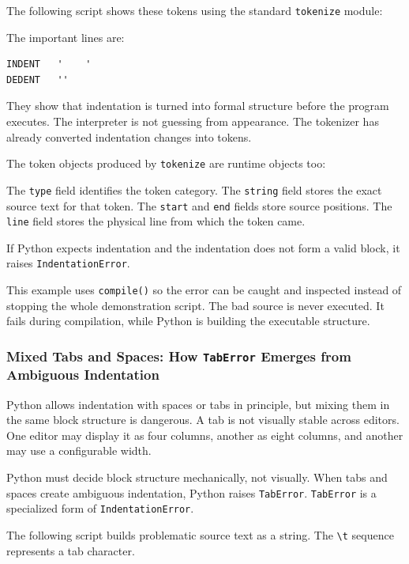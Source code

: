 The following script shows these tokens using the standard \texttt{tokenize} module:

The important lines are:

\begin{verbatim}
INDENT   '    '
DEDENT   ''
\end{verbatim}

They show that indentation is turned into formal structure before the program executes. The interpreter is not guessing from appearance. The tokenizer has already converted indentation changes into tokens.

The token objects produced by \texttt{tokenize} are runtime objects too:

The \texttt{type} field identifies the token category. The \texttt{string} field stores the exact source text for that token. The \texttt{start} and \texttt{end} fields store source positions. The \texttt{line} field stores the physical line from which the token came.

If Python expects indentation and the indentation does not form a valid block, it raises \texttt{IndentationError}.

This example uses \texttt{compile()} so the error can be caught and inspected instead of stopping the whole demonstration script. The bad source is never executed. It fails during compilation, while Python is building the executable structure.

\subsubsection{Mixed Tabs and Spaces: How \texttt{TabError} Emerges from Ambiguous Indentation}

Python allows indentation with spaces or tabs in principle, but mixing them in the same block structure is dangerous. A tab is not visually stable across editors. One editor may display it as four columns, another as eight columns, and another may use a configurable width.

Python must decide block structure mechanically, not visually. When tabs and spaces create ambiguous indentation, Python raises \texttt{TabError}. \texttt{TabError} is a specialized form of \texttt{IndentationError}.

The following script builds problematic source text as a string. The \texttt{\textbackslash t} sequence represents a tab character.

